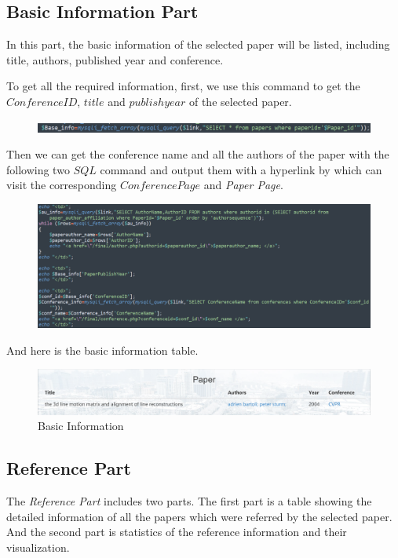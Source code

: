 \documentclass{article}
\begin{document}
	\subsection{Basic Information Part}
	In this part, the basic information of the selected paper will be listed, including title, authors, published year and conference.
	\par To get all the required information, first, we use this command to get the \(ConferenceID\), \(title\) and \(publish year\) of the selected paper.
	\begin{figure}[H]
		\centering
		\includegraphics[width=0.9\linewidth]{p_1.png}
	\end{figure}
	Then we can get the conference name and all the authors of the paper with the following two \(SQL\) command and output them with a hyperlink by which can visit the corresponding \(Conference Page\) and \emph{Paper Page}.
	\begin{figure}[H]
		\centering
		\includegraphics[width=0.9\linewidth]{p_2.png}
	\end{figure}
	And here is the basic information table.
	\begin{figure}[H]
		\centering
		\includegraphics[width=1\linewidth]{bas_info.png}
		\caption{Basic Information}
	\end{figure}
	\subsection{Reference Part}
	The \emph{Reference Part} includes two parts. The first part is a table showing the detailed information of all the papers which were referred by the selected paper. And the second part is statistics of the reference information and their visualization.
\end{document}

